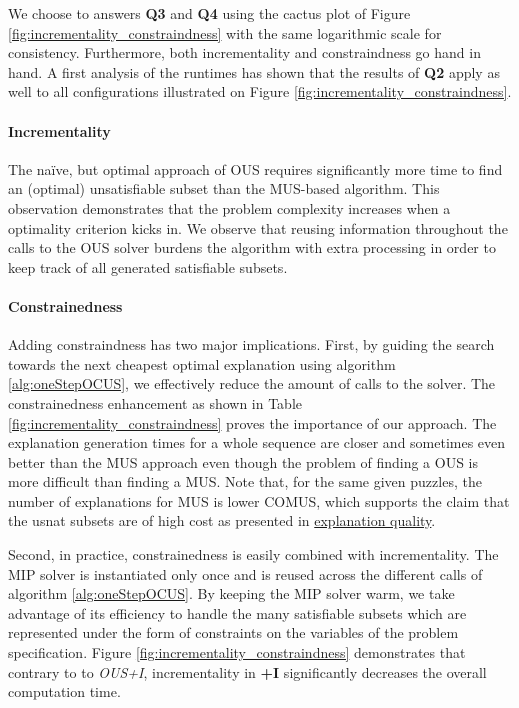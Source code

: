 We choose to answers \textbf{Q3} and \textbf{Q4} using the cactus plot of Figure \ref{fig:incrementality_constraindness} with the same logarithmic scale for consistency. Furthermore, both incrementality and constraindness go hand in hand.
A first analysis of the runtimes has shown that the results of \textbf{Q2} apply as well to all  configurations illustrated on Figure \ref{fig:incrementality_constraindness}.

\paragraph{Incrementality}

The naïve, but optimal approach of OUS requires significantly more time to find an (optimal) unsatisfiable subset than the MUS-based algorithm. This observation demonstrates that the problem complexity increases when a optimality criterion kicks in. We observe that reusing information throughout the calls to the OUS solver burdens the \onestep algorithm with extra processing in order to keep track of all generated satisfiable subsets.

\paragraph{Constrainedness}
Adding constraindness has two major implications.
First, by guiding the search towards the next cheapest optimal explanation using algorithm \ref{alg:oneStepOCUS}, we effectively reduce the amount of calls to the \omus solver.
The constrainedness enhancement as shown in Table \ref{fig:incrementality_constraindness} proves the importance of our approach.
The explanation generation times for a whole sequence are closer and sometimes even better than the MUS approach even though the problem of finding a OUS is more difficult than finding a MUS.
Note that, for the same given puzzles, the number of explanations for MUS is lower COMUS, which supports the claim that the usnat subsets are of high cost as presented in \hyperref[paragraph:explanationquality]{explanation quality}.

Second, in practice, constrainedness is easily combined with incrementality.
The MIP solver is instantiated only once and is reused across the different \onestep calls of algorithm \ref{alg:oneStepOCUS}.
By keeping the MIP solver warm, we take advantage of its efficiency to handle the many satisfiable subsets which are represented under the form of constraints on the variables of the problem specification.
Figure \ref{fig:incrementality_constraindness} demonstrates that contrary to to \emph{OUS+I}, incrementality in \textbf{\comus+I} significantly decreases the overall computation time.


